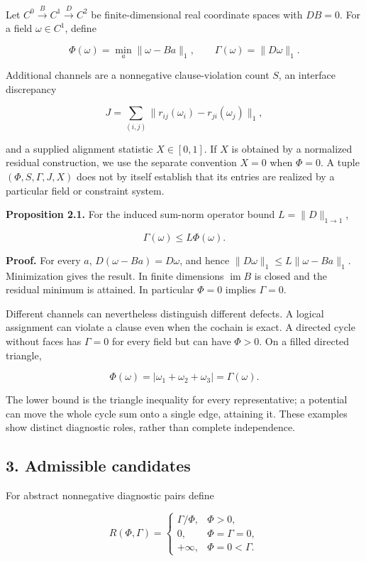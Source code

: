 \documentclass[
]{article}
\begin{document}
Let \(C^0\xrightarrow{B}C^1\xrightarrow{D}C^2\) be finite-dimensional
real coordinate spaces with \(DB=0\). For a field \(\omega\in C^1\),
define

\[
\Phi(\omega)=\min_a\|\omega-Ba\|_1,\qquad
\Gamma(\omega)=\|D\omega\|_1.
\]

Additional channels are a nonnegative clause-violation count \(S\), an
interface discrepancy

\[
J=\sum_{(i,j)}\|r_{ij}(\omega_i)-r_{ji}(\omega_j)\|_1,
\]

and a supplied alignment statistic \(X\in[0,1]\). If \(X\) is obtained
by a normalized residual construction, we use the separate convention
\(X=0\) when \(\Phi=0\). A tuple \((\Phi,S,\Gamma,J,X)\) does not by
itself establish that its entries are realized by a particular field or
constraint system.

\textbf{Proposition 2.1.} For the induced sum-norm operator bound
\(L=\|D\|_{1\to1}\),

\[
\Gamma(\omega)\le L\Phi(\omega).
\]

\textbf{Proof.} For every \(a\), \(D(\omega-Ba)=D\omega\), and hence
\(\|D\omega\|_1\le L\|\omega-Ba\|_1\). Minimization gives the result. In
finite dimensions \(\operatorname{im}B\) is closed and the residual
minimum is attained. In particular \(\Phi=0\) implies \(\Gamma=0\).

Different channels can nevertheless distinguish different defects. A
logical assignment can violate a clause even when the cochain is exact.
A directed cycle without faces has \(\Gamma=0\) for every field but can
have \(\Phi>0\). On a filled directed triangle,

\[
\Phi(\omega)=|\omega_1+\omega_2+\omega_3|=\Gamma(\omega).
\]

The lower bound is the triangle inequality for every representative; a
potential can move the whole cycle sum onto a single edge, attaining it.
These examples show distinct diagnostic roles, rather than complete
independence.

\subsection{3. Admissible candidates}\label{admissible-candidates}

For abstract nonnegative diagnostic pairs define

\[
R(\Phi,\Gamma)=
\begin{cases}
\Gamma/\Phi,&\Phi>0,\\
0,&\Phi=\Gamma=0,\\
+\infty,&\Phi=0<\Gamma.
\end{cases}
\]
\end{document}
